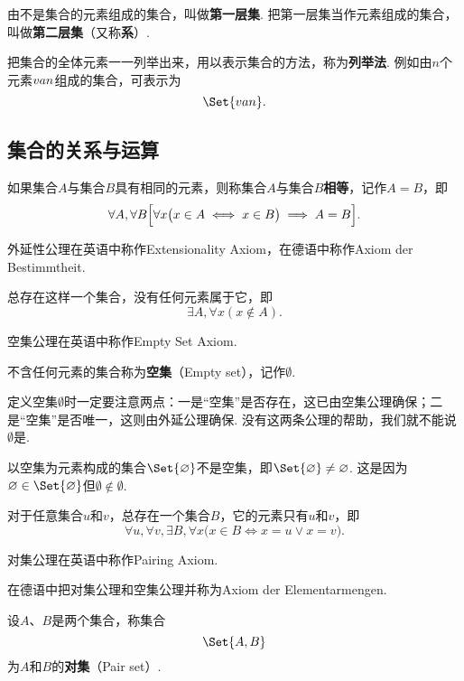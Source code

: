 \begin{definition}
由不是集合的元素组成的集合，叫做\textbf{第一层集}.
把第一层集当作元素组成的集合，叫做\textbf{第二层集}（又称\textbf{系}）.
\end{definition}

把集合的全体元素一一列举出来，用以表示集合的方法，称为\textbf{列举法}.
例如由\(n\)个元素\(v{a}{n}\)组成的集合，可表示为\[
\Set{ \v{a}{n} }.
\]

\subsection{集合的关系与运算}
\begin{axiom}[外延公理]
如果集合\(A\)与集合\(B\)具有相同的元素，则称集合\(A\)与集合\(B\)\textbf{相等}，记作\(A=B\)，即\[
\forall A, \forall B \Bigl[
	\forall x \bigl( x \in A \iff x \in B \bigr)
	\implies A = B
\Bigr].
\]
\end{axiom}
外延性公理在英语中称作Extensionality Axiom，在德语中称作Axiom der Bestimmtheit.

\begin{axiom}[空集公理]
总存在这样一个集合，没有任何元素属于它，即\[
\exists A,\forall x( x \notin A ).
\]
\end{axiom}
空集公理在英语中称作Empty Set Axiom.

\begin{definition}
不含任何元素的集合称为\textbf{空集}（Empty set），记作\(\emptyset\).
\end{definition}
定义空集\(\emptyset\)时一定要注意两点：一是“空集”是否存在，这已由空集公理确保；二是“空集”是否唯一，这则由外延公理确保.
没有这两条公理的帮助，我们就不能说\(\emptyset\)是.

\begin{example}
以空集为元素构成的集合\(\Set{\emptyset}\)不是空集，即\(\Set{\emptyset} \neq \emptyset\).
这是因为\(\emptyset \in \Set{\emptyset}\)但\(\emptyset \notin \emptyset\).
\end{example}

\begin{axiom}[对集公理]
对于任意集合\(u\)和\(v\)，总存在一个集合\(B\)，它的元素只有\(u\)和\(v\)，即\[
\forall u, \forall v, \exists B, \forall x \bigl(
	x \in B \iff x = u \lor x = v
\bigr).
\]
\end{axiom}
对集公理在英语中称作Pairing Axiom.

在德语中把对集公理和空集公理并称为Axiom der Elementarmengen.

\begin{definition}
设\(A\)、\(B\)是两个集合，称集合\[
\Set{ A, B }
\]为\(A\)和\(B\)的\textbf{对集}（Pair set）.
\end{definition}

